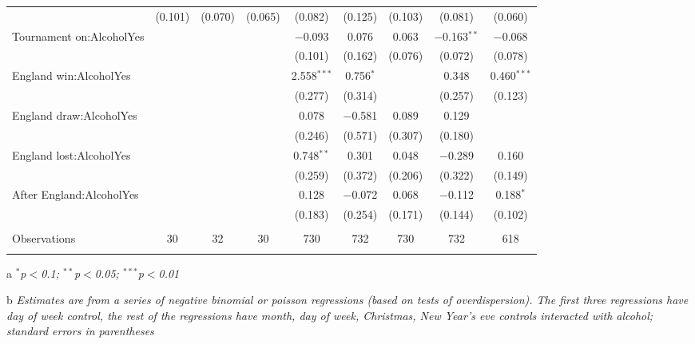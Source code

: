 \documentclass[12pt, letterpaper]{article}
\begin{document}
\begin{table}
{\begin{threeparttable}
\begin{tabular}{@{\extracolsep{5pt}}lcccccccc}
  & (0.101) & (0.070) & (0.065) & (0.082) & (0.125) & (0.103) & (0.081) & (0.060) \\ 
  Tournament on:AlcoholYes &  &  &  & $-$0.093 & 0.076 & 0.063 & $-$0.163$^{**}$ & $-$0.068 \\ 
  &  &  &  & (0.101) & (0.162) & (0.076) & (0.072) & (0.078) \\ 
  England win:AlcoholYes &  &  &  & 2.558$^{***}$ & 0.756$^{*}$ &  & 0.348 & 0.460$^{***}$ \\ 
  &  &  &  & (0.277) & (0.314) &  & (0.257) & (0.123) \\ 
  England draw:AlcoholYes &  &  &  & 0.078 & $-$0.581 & 0.089 & 0.129 &  \\ 
  &  &  &  & (0.246) & (0.571) & (0.307) & (0.180) &  \\ 
  England lost:AlcoholYes &  &  &  & 0.748$^{**}$ & 0.301 & 0.048 & $-$0.289 & 0.160 \\ 
  &  &  &  & (0.259) & (0.372) & (0.206) & (0.322) & (0.149) \\ 
  After England:AlcoholYes &  &  &  & 0.128 & $-$0.072 & 0.068 & $-$0.112 & 0.188$^{*}$ \\ 
  &  &  &  & (0.183) & (0.254) & (0.171) & (0.144) & (0.102) \\ 
 \hline \\[-1.8ex] 
Observations & 30 & 32 & 30 & 730 & 732 & 730 & 732 & 618 \\ 
\hline 
\hline \\[-1.8ex] 
\end{tabular} 
\begin{tablenotes}
      \item[a] \textit{$^{*}$p$<$0.1; $^{**}$p$<$0.05; $^{***}$p$<$0.01}
      \item[b] \textit{Estimates are from a series of negative binomial  or poisson regressions (based on tests of overdispersion). The first three regressions have day of week control, the rest of the regressions have month, day of week, Christmas, New Year's eve controls interacted with alcohol; standard errors in parentheses}
    \end{tablenotes}
\end{threeparttable} }
\end{table}
\end{document}
